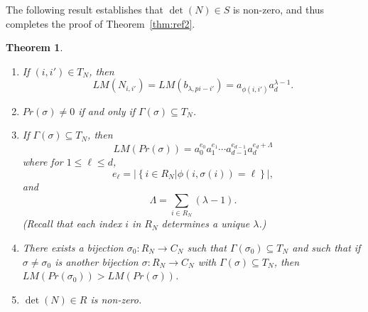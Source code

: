 \documentclass[12pt,reqno]{amsart}
\numberwithin{equation}{section}
\theoremstyle{plain}
\newtheorem{thm}[subsection]{Theorem}
\theoremstyle{definition}
\theoremstyle{remark}
\numberwithin{equation}{section}
\newcommand{\<}{\langle}
\renewcommand{\>}{\rangle}
\begin{document}
The following result establishes that $\det(N)\in S$ is non-zero, and
thus completes the proof of Theorem~\ref{thm:ref2}.

\begin{thm}\label{thm:det}\mbox{}
  \begin{enumerate}
  \item If $(i,i')\in T_N$, then
\[LM(N_{i,i'})=LM(b_{\lambda,pi-i'})=a_{\phi(i,i')}a_d^{\lambda-1}.\]
\item $Pr(\sigma)\ne0$ if and only if $\Gamma(\sigma)\subseteq T_N$.
\item If $\Gamma(\sigma)\subseteq T_N$, then
  \[LM(Pr(\sigma))=a_0^{e_0}a_1^{e_1}\cdots
    a_{d-1}^{e_{d-1}}a_d^{e_d+\Lambda}\]
  where for $1\le\ell\le d$,
  \[e_\ell=\left|\left\{i\in R_N|\phi(i,\sigma(i))=\ell\right\}\right|,\]
  and
  \[\Lambda=\sum_{i\in R_N}(\lambda-1).\]
  \textup{(}Recall that each index $i$ in $R_N$ determines a unique
  $\lambda$.\textup{)}
\item There exists a bijection $\sigma_0:R_N\to C_N$ such that
  $\Gamma(\sigma_0)\subseteq T_N$ and such that if
  $\sigma\neq\sigma_0$ is another bijection $\sigma:R_N\to C_N$ with
  $\Gamma(\sigma)\subseteq T_N$, then
  $LM(Pr(\sigma_0))>LM(Pr(\sigma))$.
\item $\det(N)\in R$ is non-zero.
  \end{enumerate}
\end{thm}
\end{document}

